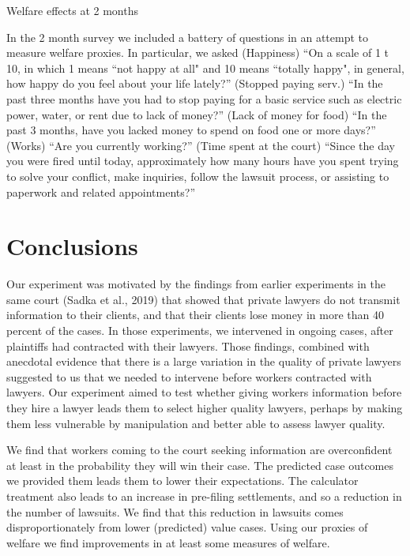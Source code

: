 \documentclass[oneside,12pt]{article}
\begin{document}
\begin{table}[!ht]
    \caption{Welfare effects at 2 months} 
    \label{tab:11_welfare}
    \center
    \scriptsize{}
    \begin{figurenotes}
    In the 2 month survey we included a battery of questions in an attempt to measure welfare proxies. In particular, we asked (Happiness) “On a scale of 1 t 10, in which 1 means “not happy at all" and 10 means “totally happy", in general, how happy do you feel about your life lately?” (Stopped paying serv.) “In the past three months have you had to stop paying for a basic service such as electric power, water, or rent due to lack of money?” (Lack of money for food) “In the past 3 months, have you lacked money to spend on food one or more days?” (Works) “Are you currently working?” (Time spent at the court) “Since the day you were fired until today, approximately how many hours have you spent trying to solve your conflict, make inquiries, follow the lawsuit process, or assisting to paperwork and related appointments?”
    \end{figurenotes}
  
\end{table}

\section{Conclusions}
Our experiment was motivated by the findings from earlier experiments in the same court (Sadka et al., 2019) that showed that private lawyers do not transmit information to their clients, and that their clients lose money in more than 40 percent of the cases. In those experiments, we intervened in ongoing cases, after plaintiffs had contracted with their lawyers. Those findings, combined with anecdotal evidence that there is a large variation in the quality of private lawyers suggested to us that we needed to intervene before workers contracted with lawyers. Our experiment aimed to test whether giving workers information before they hire a lawyer leads them to select higher quality lawyers, perhaps by making them less vulnerable by manipulation and better able to assess lawyer quality.

We find that workers coming to the court seeking information are overconfident at least in the probability they will win their case. The predicted case outcomes we provided them leads them to lower their expectations. The calculator treatment also leads to an increase in pre-filing settlements, and so a reduction in the number of lawsuits. We find that this reduction in lawsuits comes disproportionately from lower (predicted) value cases. Using our proxies of welfare we find improvements in at least some measures of welfare.
\end{document}
